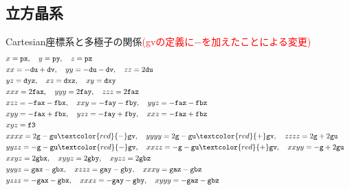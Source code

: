 \documentclass[11pt]{easymemo}
\begin{document}
\subsection{立方晶系}
Cartesian座標系と多極子の関係\textcolor{red}{(gvの定義に$-$を加えたことによる変更)}
\begin{align}
&
x=\texttt{px},
\quad
y=\texttt{py},
\quad
z=\texttt{pz}
\cr&
xx=-\texttt{du} + \texttt{dv},
\quad
yy=-\texttt{du} - \texttt{dv},
\quad
zz=2 \texttt{du}
\cr&
yz=\texttt{dyz},
\quad
xz=\texttt{dxz},
\quad
xy=\texttt{dxy}
\cr&
xxx=2 \texttt{fax},
\quad
yyy=2 \texttt{fay},
\quad
zzz=2 \texttt{faz}
\cr&
xzz=-\texttt{fax} - \texttt{fbx},
\quad
xxy=-\texttt{fay} - \texttt{fby},
\quad
yyz=-\texttt{faz} - \texttt{fbz}
\cr&
xyy= -\texttt{fax} + \texttt{fbx},
\quad
yzz= -\texttt{fay} + \texttt{fby},
\quad
xxz=-\texttt{faz} + \texttt{fbz}
\cr&
xyz=\texttt{f3}
\cr&
xxxx= 2 \texttt{g} - \texttt{gu} \textcolor{red}{-} \texttt{gv},
\quad
yyyy=2 \texttt{g} - \texttt{gu} \textcolor{red}{+} \texttt{gv},
\quad
zzzz= 2 \texttt{g} + 2\texttt{gu}
\cr&
yyzz= - \texttt{g} - \texttt{gu} \textcolor{red}{-} \texttt{gv},
\quad
xxzz = -\texttt{g} -\texttt{gu} \textcolor{red}{+} \texttt{gv},
\quad
xxyy= -\texttt{g} + 2 \texttt{gu}
\cr&
xxyz= 2 \texttt{gbx},
\quad
xyyz= 2 \texttt{gby},
\quad
xyzz = 2 \texttt{gbz}
\cr&
yyyz= \texttt{gax} - \texttt{gbx},
\quad
xzzz= \texttt{gay} - \texttt{gby},
\quad
xxxy= \texttt{gaz} - \texttt{gbz}
\cr&
yzzz= -\texttt{gax} - \texttt{gbx},
\quad
xxxz= -\texttt{gay} - \texttt{gby},
\quad
xyyy= -\texttt{gaz} - \texttt{gbz}
\label{cmprel1}
\end{align}
\end{document}
